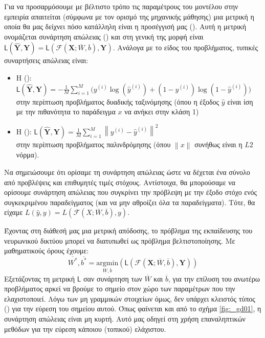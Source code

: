 Για να προσαρμόσουμε με βέλτιστο τρόπο τις παραμέτρους του μοντέλου στην εμπειρία απαιτείται (σύμφωνα με τον ορισμό της μηχανικής μάθησης) μια μετρική η οποία θα μας δείχνει πόσο κατάλληλη είναι η προσέγγισή μας (). Αυτή η μετρική ονομάζεται συνάρτηση απώλειας () και στη γενική της μορφή είναι \( \mathsf{L}(\boldsymbol{\hat{Y}},\boldsymbol{Y}) = \mathsf{L}(\mathcal{F}(\boldsymbol{X};\overline{W},\overline{b}),\boldsymbol{Y})\). Ανάλογα με το είδος του προβλήματος, τυπικές συναρτήσεις απώλειας είναι:
\begin{itemize}
  \item H (): $\mathsf{L}(\boldsymbol{\hat{Y}},\boldsymbol{Y}) = -\frac{1}{M}\sum_{i = 1}^{M} \big(y^{(i)}\log(\hat{y}^{(i)}) + (1 - y^{(i)})\log(1 - \hat{y}^{(i)})\big)$ \\στην περίπτωση προβλήματος δυαδικής ταξινόμησης (όπου η έξοδος $\hat{y}$ είναι ίση με την πιθανότητα το παράδειγμα $x$ να ανήκει στην κλάση 1)
  \item Η (): $\mathsf{L}(\boldsymbol{\hat{Y}},\boldsymbol{Y}) = \frac{1}{M}\sum_{i = 1}^{M}{\left\lVert y^{(i)} - \hat{y}^{(i)}\right\rVert}^2 $\\ στην περίπτωση προβλήματος παλινδρόμησης (όπου $\left\lVert x \right\rVert$ συνήθως είναι η $L2$ νόρμα).
\end{itemize}
Να σημειώσουμε ότι ορίσαμε τη συνάρτηση απώλειας ώστε να δέχεται ένα σύνολο από προβλέψεις και επιθυμητές τιμές στόχους. Αντίστοιχα, θα μπορούσαμε να ορίσουμε συνάρτηση απώλειας που συγκρίνει την πρόβλεψη με την έξοδο στόχο ενός συγκεκριμένου παραδείγματος (και να μην αθροίζει όλα τα παραδείγματα). Τότε, θα είχαμε \( L(\hat{y},y) = L(\mathcal{F}(X;\overline{W},\overline{b}),y)\). \par

Έχοντας στη διάθεσή μας μια μετρική απόδοσης, το πρόβλημα της εκπαίδευσης του νευρωνικού δικτύου μπορεί να διατυπωθεί ως πρόβλημα βελτιστοποίησης. Με μαθηματικούς όρους έχουμε:
\begin{equation}
  \overline{W^*},\overline{b^*} = \underset{\overline{W},\overline{b}}{\mathrm{argmin}}(\mathsf{L}(\mathcal{F}(\boldsymbol{X};\overline{W},\overline{b}),\boldsymbol{Y}))
\end{equation}
Εξετάζοντας τη μετρική $\mathsf{L}$ σαν συνάρτηση των $\overline{W}$ και $\overline{b}$, για την επίλυση του ανωτέρω προβλήματος αρκεί να βρούμε το σημείο στον χώρο των παραμέτρων που την ελαχιστοποιεί. Λόγω των μη γραμμικών στοιχείων όμως, δεν υπάρχει κλειστός τύπος () για την εύρεση του σημείου αυτού. Όπως φαίνεται και από το σχήμα \ref{fig:_gd01}, η συνάρτηση απώλειας είναι μη κυρτή. Αυτό μας οδηγεί στη χρήση επαναληπτικών μεθόδων για την εύρεση κάποιου (τοπικού) ελάχιστου. \par

